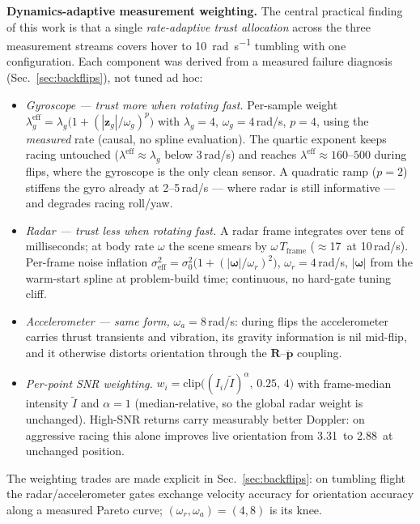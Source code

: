\documentclass[journal]{IEEEtran}
\newcommand{\vR}{\mathbf{R}}
\newcommand{\vp}{\mathbf{p}}
\newcommand{\vom}{\boldsymbol{\omega}}
\newcommand{\vz}{\mathbf{z}}
\begin{document}
\textbf{Dynamics-adaptive measurement weighting.}
The central practical finding of this work is that a single
\emph{rate-adaptive trust allocation} across the three measurement
streams covers hover to \SI{10}{\radian\per\second} tumbling with one
configuration.  Each component was derived from a measured failure
diagnosis (Sec.~\ref{sec:backflips}), not tuned ad hoc:
\begin{itemize}
\item \emph{Gyroscope --- trust more when rotating fast.}
  Per-sample weight
  $\lambda_g^{\mathrm{eff}} = \lambda_g\bigl(1 + (|\vz_g|/\omega_g)^p\bigr)$
  with $\lambda_g{=}4$, $\omega_g{=}4$\,rad/s, $p{=}4$, using the
  \emph{measured} rate (causal, no spline evaluation).  The quartic
  exponent keeps racing untouched ($\lambda^{\mathrm{eff}}\!\approx\!\lambda_g$
  below 3\,rad/s) and reaches $\lambda^{\mathrm{eff}}\!\approx\!160$--$500$
  during flips, where the gyroscope is the only clean sensor.  A
  quadratic ramp ($p{=}2$) stiffens the gyro already at 2--5\,rad/s ---
  where radar is still informative --- and degrades racing roll/yaw.
\item \emph{Radar --- trust less when rotating fast.}
  A radar frame integrates over tens of milliseconds; at body rate
  $\omega$ the scene smears by $\omega\,T_{\mathrm{frame}}$
  ($\approx$17\degree\ at 10\,rad/s).  Per-frame noise inflation
  $\sigma_{\mathrm{eff}}^2 = \sigma_0^2\bigl(1+(|\vom|/\omega_r)^2\bigr)$,
  $\omega_r{=}4$\,rad/s, $|\vom|$ from the warm-start spline at
  problem-build time; continuous, no hard-gate tuning cliff.
\item \emph{Accelerometer --- same form,} $\omega_a{=}8$\,rad/s:
  during flips the accelerometer carries thrust transients and
  vibration, its gravity information is nil mid-flip, and it otherwise
  distorts orientation through the $\vR$--$\ddot{\vp}$ coupling.
\item \emph{Per-point SNR weighting.}
  $w_i = \mathrm{clip}\bigl((I_i/\tilde{I})^{\alpha},\,0.25,\,4\bigr)$
  with frame-median intensity $\tilde I$ and $\alpha{=}1$
  (median-relative, so the global radar weight is unchanged).  High-SNR
  returns carry measurably better Doppler: on aggressive racing this
  alone improves live orientation from 3.31\degree\ to 2.88\degree\ at
  unchanged position.
\end{itemize}
The weighting trades are made explicit in
Sec.~\ref{sec:backflips}: on tumbling flight the radar/accelerometer
gates exchange velocity accuracy for orientation accuracy along a
measured Pareto curve; $(\omega_r,\omega_a){=}(4,8)$ is its knee.
\end{document}
